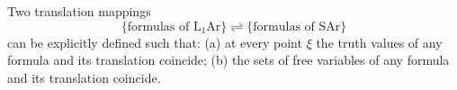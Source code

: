 Two translation mappings
$$\{ \text{formulas of } \mathrm{L}_1\mathrm{Ar} \} \rightleftharpoons \{ \text{formulas of SAr} \}$$
can be explicitly defined such that: (a) at every point $\xi$ the truth values of any formula and its translation coincide; (b) the sets of free variables of any formula and its translation coincide.
